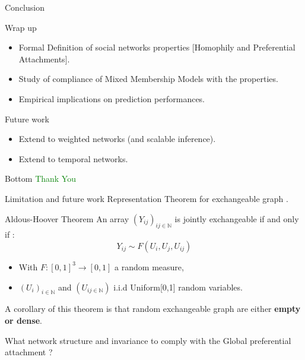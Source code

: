\begin{frame}[c]{Conclusion}
    \begin{block}{Wrap up}
    \begin{itemize}
        \item Formal Definition of social networks properties [Homophily and Preferential Attachments].
        \item Study of compliance of Mixed Membership Models with the properties.
        \item Empirical implications on prediction performances.
    \end{itemize}
    \end{block}

    \begin{block}{Future work}
    \begin{itemize}
        \item Extend to weighted networks (and scalable inference).
        \item Extend to temporal networks. 
    \end{itemize}
    \end{block}
\end{frame}

\begin{frame}[c]{Bottom}
    \textcolor{green}{Thank You}
\end{frame}

%
%
%
%
%
%
%
%
%

\begin{frame}[c]{Limitation and future work}
    Representation Theorem for exchangeable graph .

    \begin{block}{Aldous-Hoover Theorem}
        An array $(Y_{ij})_{{ij}\in \mathbb{N}}$ is jointly exchangeable if and only if :
    \begin{equation}
        Y_{ij} \sim F(U_i, U_j, U_{ij})
    \end{equation}

    \begin{itemize}
        \item With $F: [0,1]^3 \rightarrow [0,1]$ a random measure, 
        \item  $(U_i)_{i\in \mathbb{N}}$ and $(U_{{ij}\in \mathbb{N}})$   i.i.d Uniform[0,1] random variables.
    \end{itemize}
    \end{block}

    A corollary of this theorem is that random exchangeable graph are either \textbf{empty or dense}.
    \vspace{1cm}

    \MVRightarrow{} What network structure and invariance to comply with the Global preferential attachment ?

\end{frame}


